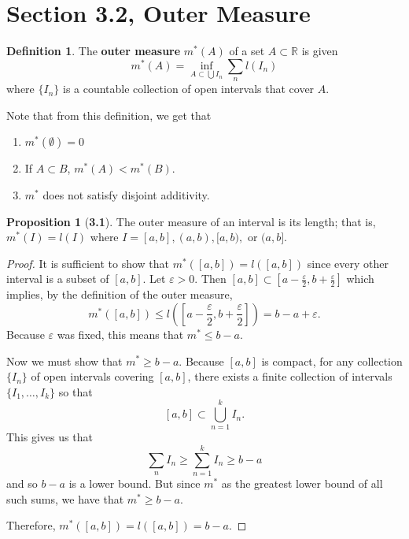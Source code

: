 \documentclass[12pt]{article}
\newcommand{\R}{\mathbb{R}}
\renewcommand{\epsilon}{\varepsilon}
\theoremstyle{definition}
\newtheorem*{definition}{Definition}
\newtheorem*{prop}{Proposition}
\begin{document}
\section*{Section 3.2, Outer Measure}

\begin{definition}

    The \textbf{outer measure} \( m^{*}(A) \) of a set \( A \subset \R \) is given
        \[
            m^{*}(A) = \inf_{A \subset \bigcup I_{n}} \sum_{n} l(I_n)  
        \]
    where \( \{I_n\} \) is a countable collection of open intervals that cover \( A \).
    
\end{definition}

Note that from this definition, we get that 
    \begin{enumerate}
        \item \( m^{*}(\emptyset) =  0 \)
        \item If \( A \subset B \), \( m^{*}(A) < m^{*}(B) \).
        \item \( m^{*} \) does not satisfy disjoint additivity. 
    \end{enumerate}
    
\begin{prop}[\textbf{3.1}]

    The outer measure of an interval is its length; that is, \( m^{*}(I) = l(I) \) where \( I = [a, b], (a, b), [a, b),\) or \( (a,b] \).

    \begin{proof}

        It is sufficient to show that \( m^{*}([a,b]) = l([a,b]) \) since every other interval is a subset of \( [a, b] \). Let \( \epsilon > 0 \). Then \( [a, b] \subset \left[a - \frac{\epsilon}{2}, b + \frac{\epsilon}{2}\right]   \) which implies, by the definition of the outer measure,
            \[
                m^{*}([a, b]) \leq l \left( \left[ a - \frac{\epsilon}{2}, b + \frac{\epsilon}{2} \right]\right) = b - a + \epsilon.  
            \]
        Because \( \epsilon \) was fixed, this means that \( m^{*} \leq b - a \). 
        
        Now we must show that \( m^{*} \geq b - a \). Because \( [a, b] \) is compact, for any collection \( \{I_n\} \) of open intervals covering \( [a,b] \), there exists a finite collection of intervals \( \{ I_1, \ldots, I_k \} \) so that 
            \[
                [a, b] \subset \bigcup_{n=1}^{k} I_n.    
            \]
        This gives us that
            \[
                \sum_{n} I_n \geq \sum_{n=1}^{k} I_n \geq b - a
            \]
        and so \( b - a \) is a lower bound. But since \( m^{*} \) as the greatest lower bound of all such sums, we have that \( m^{*} \geq b - a \).

        Therefore, \( m^{*}([a, b]) = l([a,b]) = b - a \).
        
    \end{proof}

\end{prop}
\end{document}
